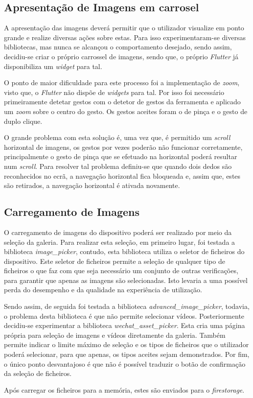 \newpage

\subsection{Apresentação de Imagens em carrosel}

A apresentação das imagens deverá permitir que o utilizador visualize em ponto grande e realize diversas ações sobre estas. Para isso experimentaram-se diversas bibliotecas, mas nunca se alcançou o comportamento desejado, sendo assim, decidiu-se criar o próprio carrossel de imagens, sendo que, o próprio \textit{Flutter} já disponibiliza um \textit{widget} para tal.

O ponto de maior dificuldade para este processo foi a implementação de \textit{zoom}, visto que, o \textit{Flutter} não dispõe de \textit{widgets} para tal. Por isso foi necessário primeiramente detetar gestos com o detetor de gestos da ferramenta e aplicado um \textit{zoom} sobre o centro do gesto. Os gestos aceites foram o de pinça e o gesto de duplo clique.

O grande problema com esta solução é, uma vez que, é permitido um \textit{scroll} horizontal de imagens, os gestos por vezes poderão não funcionar corretamente, principalmente o gesto de pinça que se efetuado na horizontal poderá resultar num \textit{scroll}. Para resolver tal problema definiu-se que quando dois dedos são reconhecidos no ecrã, a navegação horizontal fica bloqueada e, assim que, estes são retirados, a navegação horizontal é ativada novamente.

\subsection{Carregamento de Imagens}

O carregamento de imagens do dispositivo poderá ser realizado por meio da seleção da galeria. Para realizar esta seleção, em primeiro lugar, foi testada a biblioteca \textit{image\_picker}, contudo, esta biblioteca utiliza o seletor de ficheiros do dispositivo. Este seletor de ficheiros permite a seleção de qualquer tipo de ficheiros o que faz com que seja necessário um conjunto de outras verificações, para garantir que apenas as imagens são selecionadas. Isto levaria a uma possível perda do desempenho e da qualidade na experiência de utilização.

Sendo assim, de seguida foi testada a biblioteca \textit{advanced\_image\_picker}, todavia, o problema desta biblioteca é que não permite selecionar vídeos. Posteriormente decidiu-se experimentar a biblioteca \textit{wechat\_asset\_picker}. Esta cria uma página própria para seleção de imagens e vídeos diretamente da galeria. Também permite indicar o limite máximo de seleção e os tipos de ficheiros que o utilizador poderá selecionar, para que apenas, os tipos aceites sejam demonstrados. Por fim, o único ponto desvantajoso é que não é possível traduzir o botão de confirmação da seleção de ficheiros.

Após carregar os ficheiros para a memória, estes são enviados para o \textit{firestorage}.